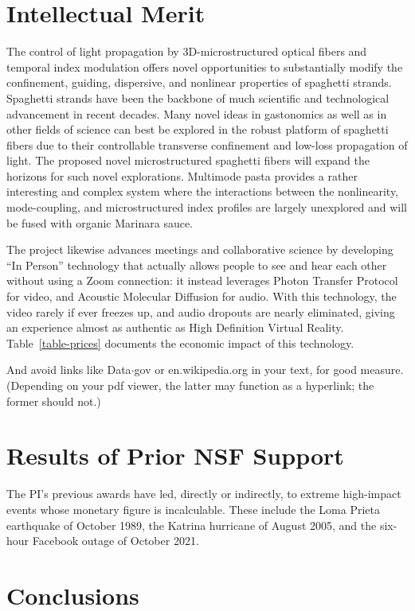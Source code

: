 \documentclass[11pt]{article}
\newcommand{\pseudodot}{{\lower 2.4pt\hbox{$\cdot$}}}
\begin{document}
\section{Intellectual Merit}

The control of light propagation by 3D-microstructured optical fibers and temporal index modulation offers novel opportunities to substantially modify the confinement, guiding, dispersive, and nonlinear properties of spaghetti strands. Spaghetti strands have been the backbone of much scientific and technological advancement in recent decades. Many novel ideas in gastonomics as well as in other fields of science can best be explored in the robust platform of spaghetti fibers due to their controllable transverse confinement and low-loss propagation of light. The proposed novel microstructured spaghetti fibers will expand the horizons for such novel explorations. Multimode pasta provides a rather interesting and complex system where the interactions between the nonlinearity, mode-coupling, and microstructured index profiles are largely unexplored and will be fused with organic Marinara sauce.

The project likewise advances meetings and collaborative science by developing ``In Person'' technology that actually allows people to see and hear each other without using a Zoom connection: it instead leverages Photon Transfer Protocol for video, and Acoustic Molecular Diffusion for audio. With this technology, the video rarely if ever freezes up, and audio dropouts are nearly eliminated, giving an experience almost as authentic as High Definition Virtual Reality. Table~\ref{table-prices} documents the economic impact of this technology.

And avoid links like Data{\pseudodot}gov or en.wikipedia.org in your text, for good measure. (Depending on your pdf viewer, the latter may function as a hyperlink; the former should not.)

\section{Results of Prior NSF Support}

The PI's previous awards have led, directly or indirectly, to extreme high-impact events whose monetary figure is incalculable. These include the Loma Prieta earthquake of October 1989, the Katrina hurricane of August 2005, and the six-hour Facebook outage of October 2021.

\section{Conclusions}
\end{document}

